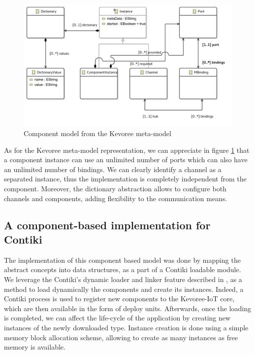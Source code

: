 \begin{figure}[htb]
	\centering
	\includegraphics[width=0.95\columnwidth]{chapters/calpulli.images/ComponentModelUML.pdf}
	\caption{Component model from the Kevoree meta-model} \label{fig:kevCompModelUML}
\end{figure}

As for the Kevoree meta-model representation, we can appreciate in figure \ref{fig:kevCompModelUML} that a component instance can use an unlimited number of ports which can also have an unlimited number of bindings.
We can clearly identify a channel as a separated instance, thus the implementation is completely independent from the component.
Moreover, the dictionary abstraction allows to configure both channels and components, adding flexibility to the communication means.

\subsection{A component-based implementation for Contiki}
\label{subsec:contikiCompModel}
The implementation of this component based model was done by mapping the abstract concepts into data structures, as a part of a Contiki loadable module.
We leverage the Contiki's dynamic loader and linker feature described in \cite{dunkels06runtime}, as a method to load dynamically the components and create its instances.
Indeed, a Contiki process is used to register new components to the Kevoree-IoT core, which are then available in the form of deploy units.
Afterwards, once the loading is completed, we can affect the life-cycle of the application by creating new instances of the newly downloaded type.
Instance creation is done using a simple memory block allocation scheme, allowing to create as many instances as free memory is available.

